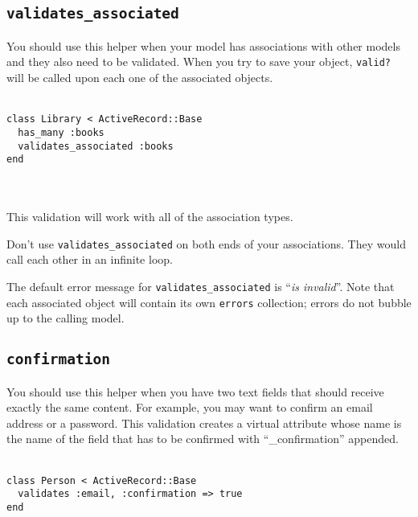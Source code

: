\documentclass[10pt]{book}
\begin{document}
\subsection{ \texttt{validates\_associated}}

You should use this helper when your model has associations with  other models and they also need to be validated. When you try to save  your object, \texttt{valid?} will be called upon each one of the associated objects.
\\ \\
\begin{minipage}{\textwidth}{\scriptsize
\begin{verbatim}
class Library < ActiveRecord::Base
  has_many :books
  validates_associated :books
end
\end{verbatim}}
\end{minipage}
\\ \\

This validation will work with all of the association types.

Don’t use \texttt{validates\_associated} on both ends of your associations. They would call each other in an infinite loop.

The default error message for \texttt{validates\_associated} is “\emph{is invalid}”. Note that each associated object will contain its own \texttt{errors} collection; errors do not bubble up to the calling model.

\subsection{ \texttt{confirmation}}

You should use this helper when you have two text fields that should  receive exactly the same content. For example, you may want to confirm  an email address or a password. This validation creates a virtual  attribute whose name is the name of the field that has to be confirmed  with “\_confirmation” appended.
\\ \\
\begin{minipage}{\textwidth}{\scriptsize
\begin{verbatim}
class Person < ActiveRecord::Base
  validates :email, :confirmation => true
end
\end{verbatim}}
\end{minipage}
\\ \\
\end{document}
